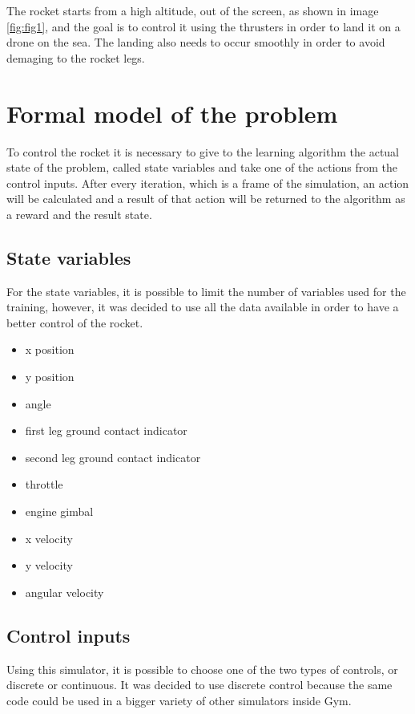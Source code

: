 \documentclass{article}
\begin{document}
The rocket starts from a high altitude, out of the screen, as shown in image \ref{fig:fig1}, and the goal is to control it using the thrusters in order to land it on a drone on the sea. The landing also needs to occur smoothly in order to avoid demaging to the rocket legs.

\section{Formal model of the problem}
To control the rocket it is necessary to give to the learning algorithm the actual state of the problem, called state variables and take one of the actions from the control inputs.
After every iteration, which is a frame of the simulation, an action will be calculated and a result of that action will be returned to the algorithm as a reward and the result state.

\subsection{State variables}
For the state variables, it is possible to limit the number of variables used for the training, however, it was decided to use all the data available in order to have a better control of the rocket.

\begin{itemize}
	\item x position
    \item y position
    \item angle
    \item first leg ground contact indicator
    \item second leg ground contact indicator
    \item throttle
    \item engine gimbal
	\item x velocity
    \item y velocity
    \item angular velocity
\end{itemize}

\subsection{Control inputs}
Using this simulator, it is possible to choose one of the two types of controls, or discrete or continuous. It was decided to use discrete control because the same code could be used in a bigger variety of other simulators inside Gym.
\end{document}
